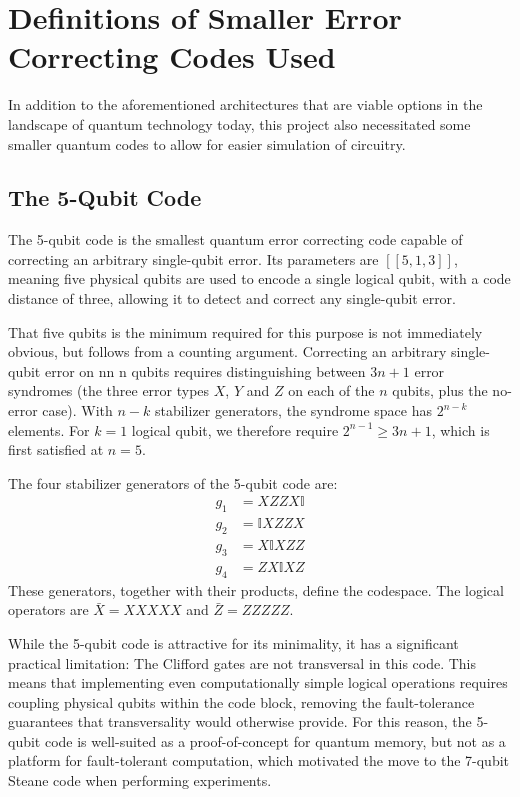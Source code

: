 \chapter{Definitions of Smaller Error Correcting Codes Used}\label{app:smaller_codes}
In addition to the aforementioned architectures that are viable options in the landscape of quantum technology today, this project also necessitated some smaller quantum codes to allow for easier simulation of circuitry.

\section{The 5-Qubit Code}
The 5-qubit code \cite{Nielsen_Chuang_2010} is the smallest quantum error correcting code capable of correcting an arbitrary single-qubit error. Its parameters are $[[5,1,3]]$, meaning five physical qubits are used to encode a single logical qubit, with a code distance of three, allowing it to detect and correct any single-qubit error.

That five qubits is the minimum required for this purpose is not immediately obvious, but follows from a counting argument. Correcting an arbitrary single-qubit error on nn
n qubits requires distinguishing between $3n+1$ error syndromes (the three error types $X$, $Y$ and $Z$ on each of the $n$ qubits, plus the no-error case). With $n - k$ stabilizer generators, the syndrome space has $2^{n-k}$ elements. For $k = 1$ logical qubit, we therefore require $2^{n-1} \geq 3n + 1$, which is first satisfied at $n = 5$.

The four stabilizer generators of the 5-qubit code are:
\begin{align*}
g_1 &= X Z Z X \mathbb{I} \\
g_2 &= \mathbb{I} X Z Z X \\
g_3 &= X \mathbb{I} X Z Z \\
g_4 &= Z X \mathbb{I} X Z
\end{align*}
These generators, together with their products, define the codespace. The logical operators are $\bar{X} = XXXXX$ and $\bar{Z} = ZZZZZ$.

While the 5-qubit code is attractive for its minimality, it has a significant practical limitation: The Clifford gates are not transversal in this code. This means that implementing even computationally simple logical operations requires coupling physical qubits within the code block, removing the fault-tolerance guarantees that transversality would otherwise provide. For this reason, the 5-qubit code is well-suited as a proof-of-concept for quantum memory, but not as a platform for fault-tolerant computation, which motivated the move to the 7-qubit Steane code when performing experiments.

